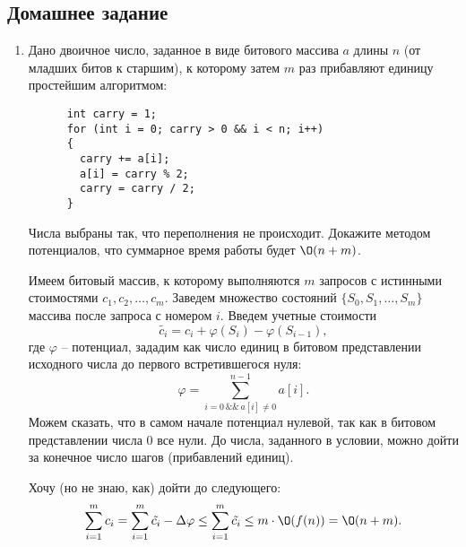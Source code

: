 \subsection{Домашнее задание}
\begin{enumerate}

  \item
    Дано двоичное число, заданное в виде битового массива $a$ длины $n$ (от младших битов к старшим), к которому
    затем $m$ раз прибавляют единицу простейшим алгоритмом:
    \begin{lstlisting}
      int carry = 1;
      for (int i = 0; carry > 0 && i < n; i++)
      {
        carry += a[i];
        a[i] = carry % 2;
        carry = carry / 2;
      }
    \end{lstlisting}
    Числа выбраны так, что переполнения не происходит. Докажите методом потенциалов, что суммарное время
    работы будет $\O(n + m)$.
    \begin{solution}
      Имеем битовый массив, к которому выполняются $m$ запросов с истинными стоимостями $c_1, c_2, \ldots, c_m$. Заведем множество состояний $\{S_0, S_1, \ldots, S_m\}$ массива после запроса с номером $i$. Введем учетные стоимости
      \begin{equation}
        \tilde{c_i} = c_i + \varphi(S_i) - \varphi(S_{i-1}),
      \end{equation}
      где $\varphi$ -- потенциал, зададим как число единиц в битовом представлении исходного числа до первого встретившегося нуля:
      \begin{equation}
        \varphi = \sum_{i = 0\, \&\&\, a[i] \neq 0}^{n - 1} a[i].
      \end{equation}
      Можем сказать, что в самом начале потенциал нулевой, так как в битовом представлении числа 0 все нули. До числа, заданного в условии, можно дойти за конечное число шагов (прибавлений единиц).

      Хочу (но не знаю, как) дойти до следующего:
      \begin{equation}
        \sum_{i = 1}^{m} c_i = \sum_{i = 1}^{m} \tilde{c_i} - \Delta \varphi \leq \sum_{i = 1}^{m} \tilde{c_i} \leq m \cdot \O(f(n)) = \O(n + m).
      \end{equation}
    \end{solution}


\end{enumerate}
